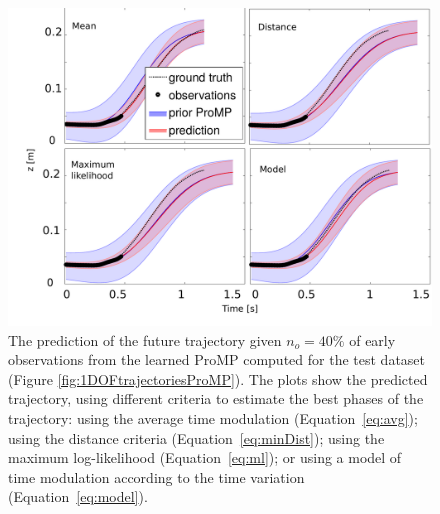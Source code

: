 \documentclass[utf8]{frontiersSCNS} %
\begin{document}
\begin{figure}[h]
\centering
\includegraphics[width=15cm]{img/1DOFtrajectoriesPredictionsDurationV2.pdf}
\caption{The prediction of the future trajectory given $n_{o}=40\%$ of early observations from the learned ProMP computed for the test dataset (Figure \ref{fig:1DOFtrajectoriesProMP}). The plots show the predicted trajectory, using different criteria to estimate the best phases of the trajectory: using the average time modulation (Equation~\ref{eq:avg}); using the distance criteria (Equation~\ref{eq:minDist}); using the maximum log-likelihood (Equation~\ref{eq:ml}); or using a model of time modulation according to the time variation (Equation~\ref{eq:model}).}
\label{fig:1DOFtrajectoriesPredictionsDuration}
\end{figure}


\end{document}
